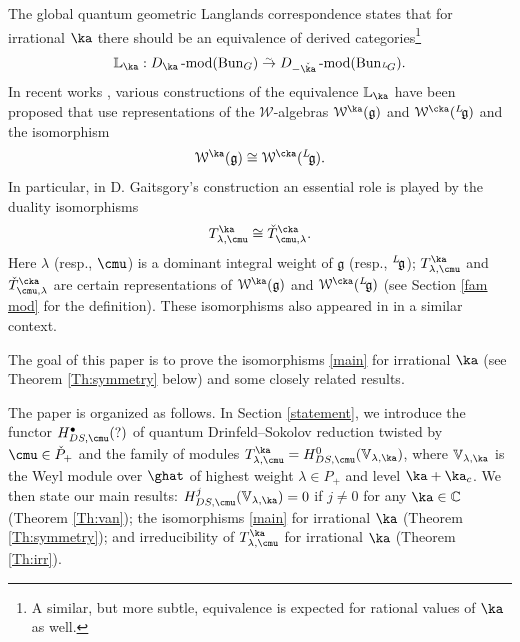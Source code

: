 \documentclass{amsart}
\newcommand{\on}{\operatorname}
\newcommand{\+}{\mathop{\oplus}}
\renewcommand{\*}{{\otimes}}
\newcommand{\mc}{\mathcal}
\newcommand{\mf}{\mathfrak}
\newcommand{\g}{\mf{g}}
\newcommand{\isomap}{{\;\stackrel{_\sim}{\to}\;}}
\newcommand{\C}{\mathbb{C}}
\newcommand{\lam}{\lambda}
\def\neg{\negthinspace}
\def\lg{{}^L\neg\g}
\def\LG{{}^L\neg G}
\theoremstyle{theorem}
\theoremstyle{remark}
\numberwithin{equation}{section}
\begin{document}
The global quantum geometric Langlands correspondence
\cite{Sto,GaiQL,FG} states that for irrational $\ka$ there should be
an equivalence of derived categories\footnote{A similar, but more
  subtle, equivalence is expected for rational values of $\ka$ as
  well.}
 \begin{align}
\mathbb{L}_\ka: D_\ka\on{-mod}(\on{Bun}_G) \isomap
D_{-\check\ka}\on{-mod}(\on{Bun}_{\LG}).
\end{align} 
In recent works \cite{GaiQL,CreGai,FG,Gaitsgory:uo}, various
constructions of the equivalence $\mathbb{L}_\ka$ have been proposed
that use representations of the ${\mc W}$-algebras ${\mc W}^\ka(\g)$
and ${\mc W}^{\cka}(\lg)$ and the isomorphism \cite{FeiFre91,FF}
$$
{\mc W}^\ka(\g) \cong {\mc W}^{\cka}(\lg).
$$
In particular, in D. Gaitsgory's construction \cite{Gaitsgory:uo}
an essential role is played by the duality isomorphisms
\begin{equation}    \label{main}
T^\ka_{\lam,\cmu} \cong \check{T}^{\cka}_{\cmu,\lam}.
\end{equation}
Here $\lam$ (resp., $\cmu$) is a dominant integral weight of $\g$
(resp., $\lg$); $T^\ka_{\lam,\cmu}$ and $\check{T}^{\cka}_{\cmu,\lam}$
are certain representations of ${\mc W}^\ka(\g)$ and ${\mc
  W}^{\cka}(\lg)$ (see Section \ref{fam mod} for the
definition). These isomorphisms also appeared in \cite{CreGai,FG} in a
similar context.

The goal of this paper is to prove the isomorphisms \eqref{main} for
irrational $\ka$ (see Theorem \ref{Th:symmetry} below) and some
closely related results.

The paper is organized as follows. In Section \ref{statement}, we
introduce the functor $H^\bullet_{DS,\cmu}(?)$ of quantum
Drinfeld--Sokolov reduction twisted by $\cmu \in \check{P}_+$ and the
family of modules $T^\ka_{\lam,\cmu} = H^0_{DS,\cmu}({\mathbb
  V}_{\lam,\ka})$, where ${\mathbb V}_{\lam,\ka}$ is the Weyl module
over $\ghat$ of highest weight $\lam \in P_+$ and level
$\ka+\ka_c$. We then state our main results: $H^j_{DS,\cmu}({\mathbb
  V}_{\lam,\ka}) = 0$ if $j \neq 0$ for any $\ka \in \C$ (Theorem
\ref{Th:van}); the isomorphisms \eqref{main} for irrational $\ka$
(Theorem \ref{Th:symmetry}); and irreducibility of $T^\ka_{\lam,\cmu}$
for irrational $\ka$ (Theorem \ref{Th:irr}).
\end{document}
